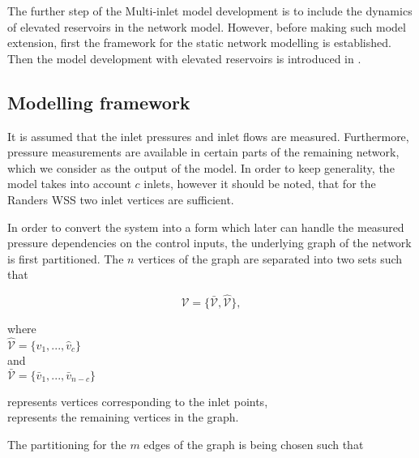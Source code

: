 The further step of the Multi-inlet model development is to include the dynamics of elevated reservoirs in the network model. However, before making such model extension, first the framework for the static network modelling is established. Then the model development with elevated reservoirs is introduced in . 

\subsection{Modelling framework}
\label{modelling_framework}

It is assumed that the inlet pressures and inlet flows are measured. Furthermore, pressure measurements are available in certain parts of the remaining network, which we consider as the output of the model. In order to keep generality, the model takes into account $c$ inlets, however it should be noted, that for the Randers WSS two inlet vertices are sufficient. 

In order to convert the system into a form which later can handle the measured pressure dependencies on the control inputs, the underlying graph of the network is first partitioned. The $n$ vertices of the graph are separated into two sets such that

\begin{equation}
  \label{vertices1}
  \mathcal{V} = \{\bar{\mathcal{V}}, \hat{\mathcal{V}} \}, 
\end{equation}

\begin{minipage}[t]{0.3\textwidth}
where\\
\hspace*{8mm} $\hat{\mathcal{V}} = \{\hat{v}_1, ..., \hat{v}_c\}$\\
\newline
and \\
\hspace*{8mm} $\bar{\mathcal{V}} = \{\bar{v}_1, ..., \bar{v}_{n-c}\}$ 
\end{minipage}
\begin{minipage}[t]{0.55\textwidth}
\vspace*{2mm}
 represents vertices corresponding to the inlet points,\\
 \newline
 represents the remaining vertices in the graph.
\end{minipage}

The partitioning for the $m$ edges of the graph is being chosen such that

